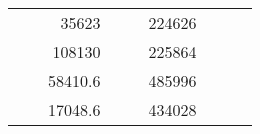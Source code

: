 \begin{table}[H]
\begin{tabular}{|ccrccrccc}
\multicolumn{1}{|c|}{\cellcolor[HTML]{FFFFC7}}                                & \multicolumn{1}{c|}{\cellcolor[HTML]{DAE8FC}}                      & \multicolumn{1}{r|}{\cellcolor[HTML]{DAE8FC}35623}     & \multicolumn{1}{c|}{\cellcolor[HTML]{FFFFC7}}                                & \multicolumn{1}{c|}{\cellcolor[HTML]{DAE8FC}}                       & \multicolumn{1}{r|}{\cellcolor[HTML]{DDFDFF}224626}    &                                                                              &                                                                    &                                                        \\ \cline{3-3} \cline{6-6}
\multicolumn{1}{|c|}{\cellcolor[HTML]{FFFFC7}}                                & \multicolumn{1}{c|}{\cellcolor[HTML]{DAE8FC}}                      & \multicolumn{1}{r|}{\cellcolor[HTML]{DDFDFF}108130}    & \multicolumn{1}{c|}{\cellcolor[HTML]{FFFFC7}}                                & \multicolumn{1}{c|}{\cellcolor[HTML]{DAE8FC}}                       & \multicolumn{1}{r|}{\cellcolor[HTML]{DAE8FC}225864}    &                                                                              &                                                                    &                                                        \\ \cline{3-3} \cline{6-6}
\multicolumn{1}{|c|}{\cellcolor[HTML]{FFFFC7}}                                & \multicolumn{1}{c|}{\cellcolor[HTML]{DAE8FC}}                      & \multicolumn{1}{r|}{\cellcolor[HTML]{DAE8FC}58410.6}   & \multicolumn{1}{c|}{\cellcolor[HTML]{FFFFC7}}                                & \multicolumn{1}{c|}{\cellcolor[HTML]{DAE8FC}}                       & \multicolumn{1}{r|}{\cellcolor[HTML]{DDFDFF}485996}    &                                                                              &                                                                    &                                                        \\ \cline{3-3} \cline{6-6}
\multicolumn{1}{|c|}{\cellcolor[HTML]{FFFFC7}}                                & \multicolumn{1}{c|}{\cellcolor[HTML]{DAE8FC}}                      & \multicolumn{1}{r|}{\cellcolor[HTML]{DDFDFF}17048.6}   & \multicolumn{1}{c|}{\cellcolor[HTML]{FFFFC7}}                                & \multicolumn{1}{c|}{\cellcolor[HTML]{DAE8FC}}                       & \multicolumn{1}{r|}{\cellcolor[HTML]{DAE8FC}434028}    &                                                                              &                                                                    &                                                        \\ \cline{3-3} \cline{6-6}

\end{tabular}
\end{table}
